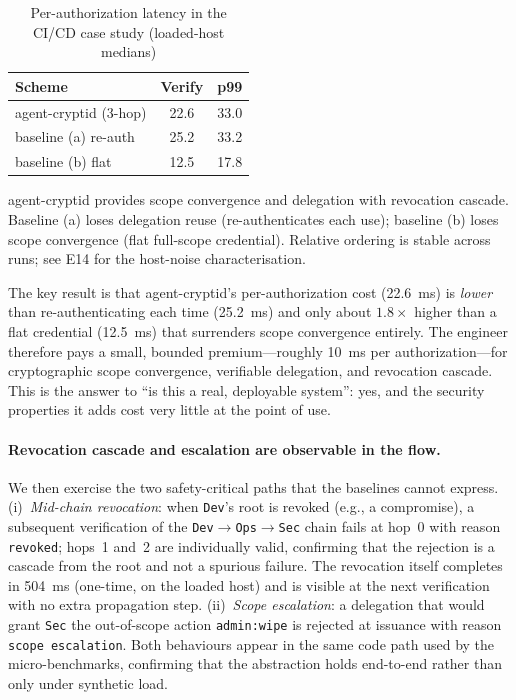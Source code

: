 \documentclass[10pt,twocolumn]{IEEEtran}
\begin{document}
\begin{table}[h!]
  \caption{Per-authorization latency in the CI/CD case study (loaded-host medians)}
  \label{tab:e17}
  \centering\small\setlength{\tabcolsep}{4pt}
  \begin{tabular}{lcc}
    \toprule
    \textbf{Scheme} & \textbf{Verify} & \textbf{p99} \\
    \midrule
    agent-cryptid (3-hop) & 22.6 & 33.0 \\
    baseline (a) re-auth & 25.2 & 33.2 \\
    baseline (b) flat & 12.5 & 17.8 \\
    \bottomrule
  \end{tabular}
\end{table}

agent-cryptid provides scope convergence and delegation with revocation
cascade. Baseline (a) loses delegation reuse (re-authenticates each use);
baseline (b) loses scope convergence (flat full-scope credential).
Relative ordering is stable across runs; see E14 for the host-noise
characterisation.

The key result is that agent-cryptid's per-authorization cost
(22.6~ms) is \emph{lower} than re-authenticating each time
(25.2~ms) and only about $1.8\times$ higher than a flat credential
(12.5~ms) that surrenders scope convergence entirely. The engineer
therefore pays a small, bounded premium---roughly 10~ms per
authorization---for cryptographic scope convergence, verifiable
delegation, and revocation cascade. This is the answer to ``is this
a real, deployable system'': yes, and the security properties it
adds cost very little at the point of use.

\paragraph{Revocation cascade and escalation are observable in the flow.}
We then exercise the two safety-critical paths that the baselines
cannot express. (i)~\emph{Mid-chain revocation}: when \texttt{Dev}'s
root is revoked (e.g., a compromise), a subsequent verification of
the \texttt{Dev}$\to$\texttt{Ops}$\to$\texttt{Sec} chain fails at
hop~0 with reason \texttt{revoked}; hops~1 and~2 are individually
valid, confirming that the rejection is a cascade from the root and
not a spurious failure. The revocation itself completes in 504~ms
(one-time, on the loaded host) and is visible at the next
verification with no extra propagation step. (ii)~\emph{Scope
escalation}: a delegation that would grant \texttt{Sec} the
out-of-scope action \texttt{admin:wipe} is rejected at issuance
with reason \texttt{scope escalation}. Both behaviours appear in the
same code path used by the micro-benchmarks, confirming that the
abstraction holds end-to-end rather than only under synthetic load.
\end{document}
